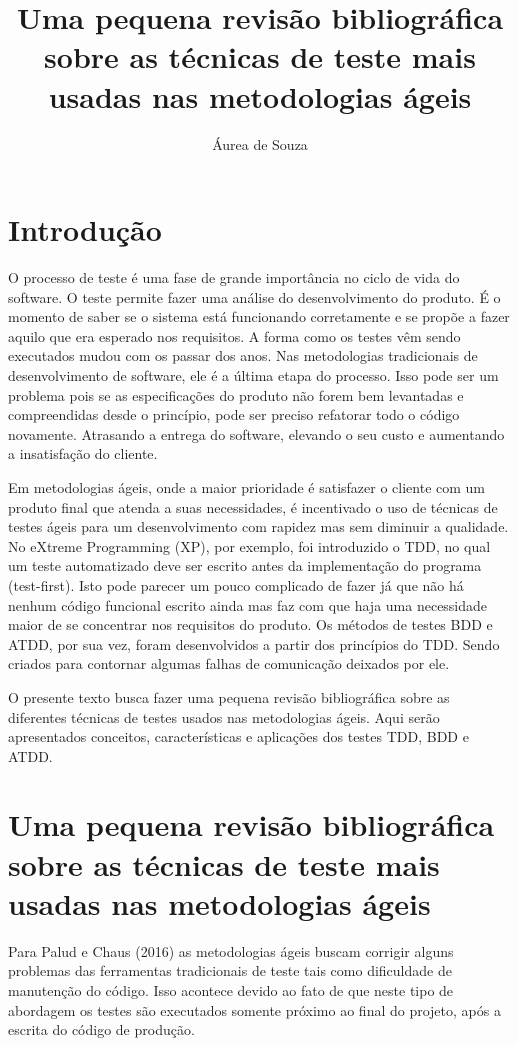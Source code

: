 \documentclass{article}
\title{Uma pequena revisão bibliográfica sobre as técnicas de teste mais usadas nas metodologias ágeis}
\author{Áurea de Souza}
\date{}
\begin{document}
\maketitle

\section{Introdução}

    O processo de teste é uma fase de grande importância no ciclo de vida do software. O teste permite fazer uma análise do desenvolvimento do produto.
É o momento de saber se o sistema está funcionando corretamente e se propõe a fazer aquilo que era esperado nos requisitos. A forma como os testes vêm
sendo executados mudou com os passar dos anos. Nas metodologias tradicionais de desenvolvimento de software, ele é a última etapa do processo. Isso pode
ser um problema pois se as especificações do produto não forem bem levantadas e compreendidas desde o princípio, pode ser preciso refatorar todo o código novamente. Atrasando a entrega do software, elevando o seu custo e aumentando a insatisfação do cliente. 

    Em metodologias ágeis, onde a maior prioridade é satisfazer o cliente com um produto final que atenda a suas necessidades, é incentivado o uso de
técnicas de testes ágeis para um desenvolvimento com rapidez mas sem diminuir a qualidade. No eXtreme Programming (XP), por exemplo, foi introduzido o
TDD, no qual um teste automatizado deve ser escrito antes da implementação do programa (test-first). Isto pode parecer um pouco complicado de fazer já
que não há nenhum código funcional escrito ainda mas faz com que haja uma necessidade maior de se concentrar nos requisitos do produto. Os métodos de
testes BDD e ATDD, por sua vez, foram desenvolvidos a partir dos princípios do TDD. Sendo criados para contornar algumas falhas de comunicação deixados
por ele. 

    O presente texto busca fazer uma pequena revisão bibliográfica sobre as diferentes técnicas de testes usados nas metodologias ágeis. Aqui serão
apresentados conceitos, características e aplicações dos testes TDD, BDD e ATDD.


\section{Uma pequena revisão bibliográfica sobre as técnicas de teste mais usadas nas metodologias ágeis}
    Para Palud e Chaus (2016) as metodologias ágeis buscam corrigir alguns problemas das ferramentas tradicionais de teste tais como dificuldade de
manutenção do código. Isso acontece devido ao fato de que neste tipo de abordagem os testes são executados somente próximo ao final do projeto,  após a
escrita do código de produção.
\end{document}
